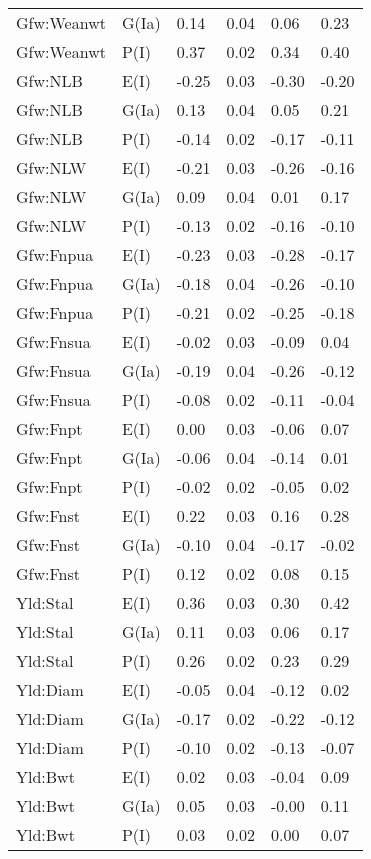 \begin{center}
\begin{longtable}{|p{1.1in}|p{0.7in}|p{0.7in}|p{0.6in}|p{0.6in}|p{0.6in}|}
  Gfw:Weanwt & G(Ia) & 0.14 & 0.04 & 0.06 & 0.23 \\ 
  Gfw:Weanwt & P(I) & 0.37 & 0.02 & 0.34 & 0.40 \\ 
  Gfw:NLB & E(I) & -0.25 & 0.03 & -0.30 & -0.20 \\ 
  Gfw:NLB & G(Ia) & 0.13 & 0.04 & 0.05 & 0.21 \\ 
  Gfw:NLB & P(I) & -0.14 & 0.02 & -0.17 & -0.11 \\ 
  Gfw:NLW & E(I) & -0.21 & 0.03 & -0.26 & -0.16 \\ 
  Gfw:NLW & G(Ia) & 0.09 & 0.04 & 0.01 & 0.17 \\ 
  Gfw:NLW & P(I) & -0.13 & 0.02 & -0.16 & -0.10 \\ 
  Gfw:Fnpua & E(I) & -0.23 & 0.03 & -0.28 & -0.17 \\ 
  Gfw:Fnpua & G(Ia) & -0.18 & 0.04 & -0.26 & -0.10 \\ 
  Gfw:Fnpua & P(I) & -0.21 & 0.02 & -0.25 & -0.18 \\ 
  Gfw:Fnsua & E(I) & -0.02 & 0.03 & -0.09 & 0.04 \\ 
  Gfw:Fnsua & G(Ia) & -0.19 & 0.04 & -0.26 & -0.12 \\ 
  Gfw:Fnsua & P(I) & -0.08 & 0.02 & -0.11 & -0.04 \\ 
  Gfw:Fnpt & E(I) & 0.00 & 0.03 & -0.06 & 0.07 \\ 
  Gfw:Fnpt & G(Ia) & -0.06 & 0.04 & -0.14 & 0.01 \\ 
  Gfw:Fnpt & P(I) & -0.02 & 0.02 & -0.05 & 0.02 \\ 
  Gfw:Fnst & E(I) & 0.22 & 0.03 & 0.16 & 0.28 \\ 
  Gfw:Fnst & G(Ia) & -0.10 & 0.04 & -0.17 & -0.02 \\ 
  Gfw:Fnst & P(I) & 0.12 & 0.02 & 0.08 & 0.15 \\ 
  Yld:Stal & E(I) & 0.36 & 0.03 & 0.30 & 0.42 \\ 
  Yld:Stal & G(Ia) & 0.11 & 0.03 & 0.06 & 0.17 \\ 
  Yld:Stal & P(I) & 0.26 & 0.02 & 0.23 & 0.29 \\ 
  Yld:Diam & E(I) & -0.05 & 0.04 & -0.12 & 0.02 \\ 
  Yld:Diam & G(Ia) & -0.17 & 0.02 & -0.22 & -0.12 \\ 
  Yld:Diam & P(I) & -0.10 & 0.02 & -0.13 & -0.07 \\ 
  Yld:Bwt & E(I) & 0.02 & 0.03 & -0.04 & 0.09 \\ 
  Yld:Bwt & G(Ia) & 0.05 & 0.03 & -0.00 & 0.11 \\ 
  Yld:Bwt & P(I) & 0.03 & 0.02 & 0.00 & 0.07 \\ 

\end{longtable}
\end{center}
